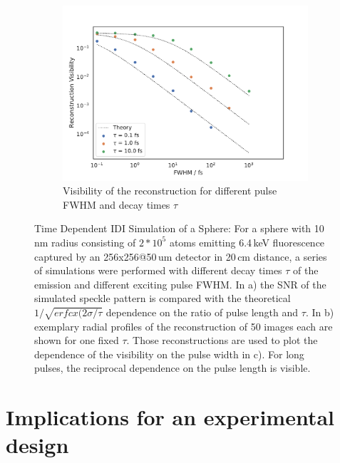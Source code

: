 \begin{figure}
	\begin{subfigure}[b]{0.45\textwidth}
		\includegraphics[width=\linewidth]{images/timedependent_2.pdf}
		\caption{Visibility of the reconstruction for different pulse FWHM and decay times $\tau$}
	\end{subfigure}
	\caption[Time Dependent IDI Simulation of a Sphere]{Time Dependent IDI Simulation of a Sphere: For a sphere with 10\,nm radius consisting of $2*10^5$ atoms emitting 6.4\,keV fluorescence captured by an 256x256@50\,um detector in 20\,cm distance, a series of simulations were performed with different decay times $\tau$ of the emission and different exciting pulse FWHM. In a) the SNR of the simulated speckle pattern is compared with the theoretical  $1/\sqrt{erfcx(2\sigma/\tau}$ dependence on the ratio of pulse length and $\tau$. In b) exemplary radial profiles of the reconstruction of 50 images each are shown for one fixed $\tau$. Those reconstructions are used to plot the  dependence of the visibility on the pulse width in c). For long pulses, the reciprocal dependence on the pulse length is visible.}
	\label{fig:tdpshere}
\end{figure}


\section{Implications for an experimental design}

